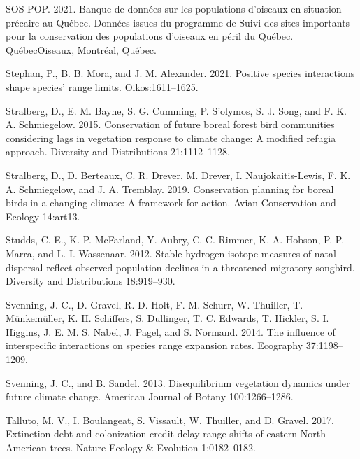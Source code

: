 \documentclass[12pt]{article}
\newlength{\cslhangindent}
\newenvironment{cslreferences}%
  {\setlength{\parindent}{0pt}%
  \everypar{\setlength{\hangindent}{\cslhangindent}}\ignorespaces}%
  {\par}
\begin{document}
\begin{cslreferences}
\leavevmode\hypertarget{ref-sos-pop_banque_2021}{}%
SOS-POP. 2021. Banque de données sur les populations d'oiseaux en
situation précaire au Québec. Données issues du programme de Suivi des
sites importants pour la conservation des populations d'oiseaux en péril
du Québec. QuébecOiseaux, Montréal, Québec.

\leavevmode\hypertarget{ref-stephan_positive_2021}{}%
Stephan, P., B. B. Mora, and J. M. Alexander. 2021. Positive species
interactions shape species' range limits. Oikos:1611--1625.

\leavevmode\hypertarget{ref-stralberg_conservation_2015}{}%
Stralberg, D., E. M. Bayne, S. G. Cumming, P. S\a'olymos, S. J. Song,
and F. K. A. Schmiegelow. 2015. Conservation of future boreal forest
bird communities considering lags in vegetation response to climate
change: A modified refugia approach. Diversity and Distributions
21:1112--1128.

\leavevmode\hypertarget{ref-stralberg_conservation_2019}{}%
Stralberg, D., D. Berteaux, C. R. Drever, M. Drever, I.
Naujokaitis-Lewis, F. K. A. Schmiegelow, and J. A. Tremblay. 2019.
Conservation planning for boreal birds in a changing climate: A
framework for action. Avian Conservation and Ecology 14:art13.

\leavevmode\hypertarget{ref-studds_stable-hydrogen_2012}{}%
Studds, C. E., K. P. McFarland, Y. Aubry, C. C. Rimmer, K. A. Hobson, P.
P. Marra, and L. I. Wassenaar. 2012. Stable-hydrogen isotope measures of
natal dispersal reflect observed population declines in a threatened
migratory songbird. Diversity and Distributions 18:919--930.

\leavevmode\hypertarget{ref-svenning_influence_2014}{}%
Svenning, J. C., D. Gravel, R. D. Holt, F. M. Schurr, W. Thuiller, T.
Münkemüller, K. H. Schiffers, S. Dullinger, T. C. Edwards, T. Hickler,
S. I. Higgins, J. E. M. S. Nabel, J. Pagel, and S. Normand. 2014. The
influence of interspecific interactions on species range expansion
rates. Ecography 37:1198--1209.

\leavevmode\hypertarget{ref-svenning_disequilibrium_2013}{}%
Svenning, J. C., and B. Sandel. 2013. Disequilibrium vegetation dynamics
under future climate change. American Journal of Botany 100:1266--1286.

\leavevmode\hypertarget{ref-talluto_extinction_2017}{}%
Talluto, M. V., I. Boulangeat, S. Vissault, W. Thuiller, and D. Gravel.
2017. Extinction debt and colonization credit delay range shifts of
eastern North American trees. Nature Ecology \& Evolution 1:0182--0182.


\end{cslreferences}
\end{document}
